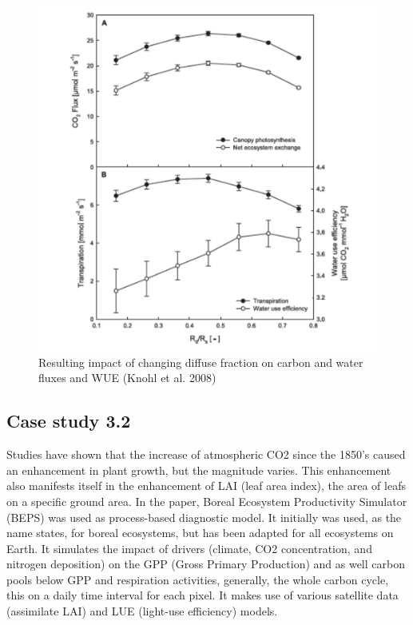 \documentclass[12pt,oneside]{book}
\begin{document}
\begin{figure}

{\centering \includegraphics[width=0.8\linewidth]{figures/chap3/f333_knohl2} 

}

\caption{Resulting impact of changing diffuse fraction on carbon and water fluxes and WUE (Knohl et al. 2008)}\label{fig:f333}
\end{figure}

\subsection{Case study 3.2}\label{case-study-3.2}

Studies have shown that the increase of atmospheric CO2 since the 1850's
caused an enhancement in plant growth, but the magnitude varies. This
enhancement also manifests itself in the enhancement of LAI (leaf area
index), the area of leafs on a specific ground area. In the paper,
Boreal Ecosystem Productivity Simulator (BEPS) was used as process-based
diagnostic model. It initially was used, as the name states, for boreal
ecosystems, but has been adapted for all ecosystems on Earth. It
simulates the impact of drivers (climate, CO2 concentration, and
nitrogen deposition) on the GPP (Gross Primary Production) and as well
carbon pools below GPP and respiration activities, generally, the whole
carbon cycle, this on a daily time interval for each pixel. It makes use
of various satellite data (assimilate LAI) and LUE (light-use
efficiency) models.
\end{document}
